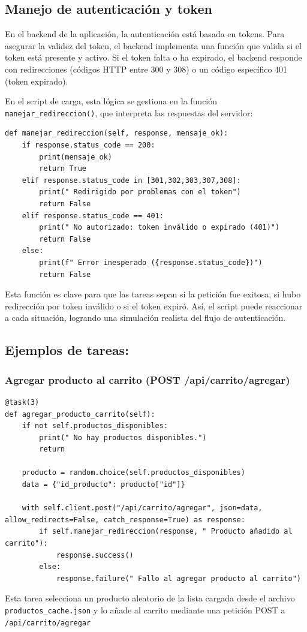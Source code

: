 \documentclass[10pt]{book}
\begin{document}
\subsection{Manejo de autenticación y token}

En el backend de la aplicación, la autenticación está basada en tokens. Para asegurar la validez del token, el backend implementa una función que valida si el token está presente y activo. Si el token falta o ha expirado, el backend responde con redirecciones (códigos HTTP entre 300 y 308) o un código específico 401 (token expirado).

En el script de carga, esta lógica se gestiona en la función \texttt{manejar\_redireccion()}, que interpreta las respuestas del servidor:

\begin{lstlisting}[style=pythonclean, caption={Gestión de redirecciones y expiración de token}]
def manejar_redireccion(self, response, mensaje_ok):
    if response.status_code == 200:
        print(mensaje_ok)
        return True
    elif response.status_code in [301,302,303,307,308]:
        print(" Redirigido por problemas con el token")
        return False
    elif response.status_code == 401:
        print(" No autorizado: token inválido o expirado (401)")
        return False
    else:
        print(f" Error inesperado ({response.status_code})")
        return False
\end{lstlisting}

Esta función es clave para que las tareas sepan si la petición fue exitosa, si hubo redirección por token inválido o si el token expiró. Así, el script puede reaccionar a cada situación, logrando una simulación realista del flujo de autenticación.


\subsection{Ejemplos de tareas:}

\subsubsection{Agregar producto al carrito (POST /api/carrito/agregar)}

\begin{lstlisting}[style=pythonclean, caption={Tarea para agregar un producto al carrito}]
@task(3)
def agregar_producto_carrito(self):
    if not self.productos_disponibles:
        print(" No hay productos disponibles.")
        return

    producto = random.choice(self.productos_disponibles)
    data = {"id_producto": producto["id"]}

    with self.client.post("/api/carrito/agregar", json=data, allow_redirects=False, catch_response=True) as response:
        if self.manejar_redireccion(response, " Producto añadido al carrito"):
            response.success()
        else:
            response.failure(" Fallo al agregar producto al carrito")
\end{lstlisting}
Esta tarea selecciona un producto aleatorio de la lista cargada desde el archivo \texttt{productos\_cache.json} y lo añade al carrito mediante una petición POST a \texttt{/api/carrito/agregar}
\end{document}
